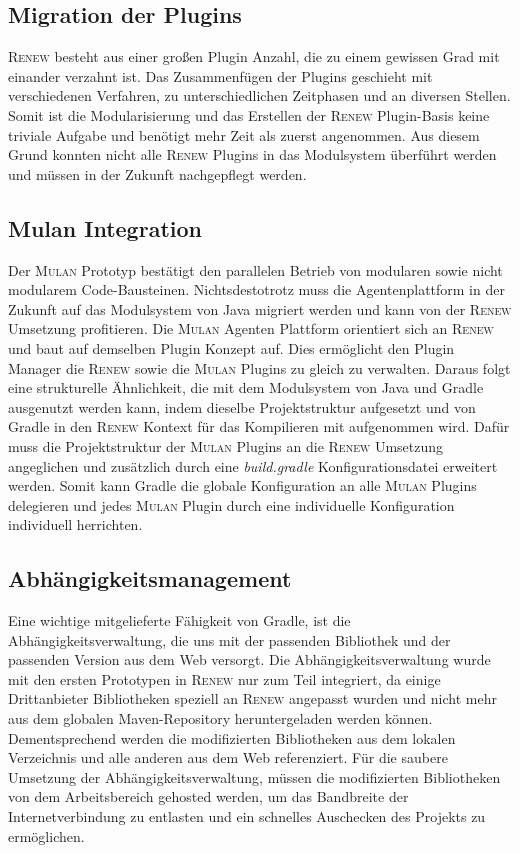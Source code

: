  \subsection*{Migration der Plugins}
	\textsc{Renew} besteht aus einer großen Plugin Anzahl, die zu einem gewissen Grad mit einander verzahnt ist. Das  Zusammenfügen der Plugins geschieht mit verschiedenen Verfahren, zu unterschiedlichen Zeitphasen und an diversen Stellen. Somit ist die Modularisierung und das Erstellen der \textsc{Renew} Plugin-Basis keine triviale Aufgabe und benötigt mehr Zeit als zuerst angenommen. Aus diesem Grund konnten nicht alle \textsc{Renew} Plugins in das Modulsystem überführt werden und müssen in der Zukunft nachgepflegt werden. 

 \subsection*{Mulan Integration}
	Der \textsc{Mulan} Prototyp bestätigt den parallelen Betrieb von modularen sowie nicht modularem Code-Bausteinen. Nichtsdestotrotz muss die Agentenplattform in der Zukunft auf das Modulsystem von Java migriert werden und kann von der \textsc{Renew} Umsetzung profitieren.\newline 
	Die \textsc{Mulan} Agenten Plattform orientiert sich an \textsc{Renew} und baut auf demselben Plugin Konzept auf. Dies ermöglicht den Plugin Manager die \textsc{Renew} sowie die \textsc{Mulan} Plugins zu gleich zu verwalten. Daraus folgt eine strukturelle Ähnlichkeit, die mit dem Modulsystem von Java und Gradle ausgenutzt werden kann, indem dieselbe Projektstruktur aufgesetzt und von Gradle in den \textsc{Renew} Kontext für das Kompilieren mit aufgenommen wird.\newline
	Dafür muss die Projektstruktur der \textsc{Mulan} Plugins an die \textsc{Renew} Umsetzung angeglichen und zusätzlich durch eine \textit{build.gradle} Konfigurationsdatei erweitert werden. Somit kann Gradle die globale Konfiguration an alle \textsc{Mulan} Plugins delegieren und jedes \textsc{Mulan} Plugin durch eine individuelle Konfiguration individuell herrichten. 
		
 \subsection*{Abhängigkeitsmanagement}
	Eine wichtige mitgelieferte Fähigkeit von Gradle, ist die Abhängigkeitsverwaltung, die uns mit der passenden Bibliothek und der passenden Version aus dem Web versorgt. Die Abhängigkeitsverwaltung wurde mit den ersten Prototypen in \textsc{Renew} nur zum Teil integriert, da einige Drittanbieter Bibliotheken speziell an \textsc{Renew} angepasst wurden und nicht mehr aus dem globalen Maven-Repository heruntergeladen werden können. Dementsprechend werden die modifizierten Bibliotheken aus dem lokalen Verzeichnis und alle anderen aus dem Web referenziert.\newline
	Für die saubere Umsetzung der Abhängigkeitsverwaltung, müssen die modifizierten Bibliotheken von dem Arbeitsbereich gehosted werden, um das Bandbreite der Internetverbindung zu entlasten und ein schnelles Auschecken des Projekts zu ermöglichen. 	
	
